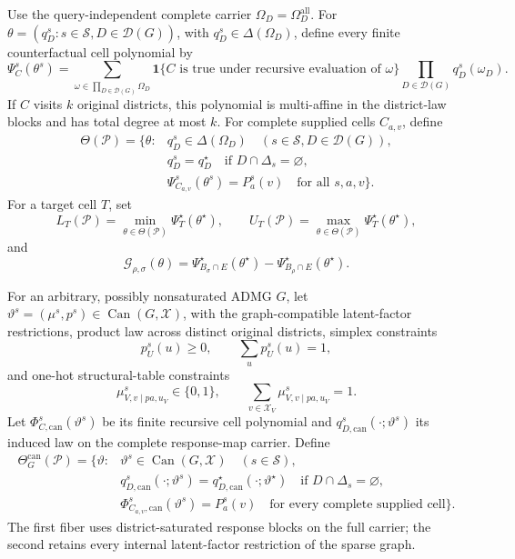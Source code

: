 Use the query-independent complete carrier \(\Omega_D=\Omega_D^{\mathrm{all}}\).  For \(\theta=(q_D^s:s\in\mathcal S,D\in\mathcal D(G))\), with \(q_D^s\in\Delta(\Omega_D)\), define every finite counterfactual cell polynomial by
\[
\Psi_C^s(\theta^s)=
\sum_{\omega\in\prod_{D\in\mathcal D(G)}\Omega_D}
\mathbf 1\{C\text{ is true under recursive evaluation of }\omega\}
\prod_{D\in\mathcal D(G)}q_D^s(\omega_D).
\]
If \(C\) visits \(k\) original districts, this polynomial is multi-affine in the district-law blocks and has total degree at most \(k\).  For complete supplied cells \(C_{a,v}\), define
\[
\begin{split}
\Theta(\mathcal P)=\bigl\{\theta:{}&q_D^s\in\Delta(\Omega_D)
\quad(s\in\mathcal S,D\in\mathcal D(G)),\\
&q_D^s=q_D^\star\quad\text{if }D\cap\Delta_s=\varnothing,\\
&\Psi_{C_{a,v}}^s(\theta^s)=P_a^s(v)
\quad\text{for all }s,a,v\bigr\}.
\end{split}
\]
For a target cell \(T\), set
\[
L_T(\mathcal P)=\min_{\theta\in\Theta(\mathcal P)}\Psi_T^\star(\theta^\star),
\qquad
U_T(\mathcal P)=\max_{\theta\in\Theta(\mathcal P)}\Psi_T^\star(\theta^\star),
\]
and
\[
\mathcal G_{\rho,\sigma}(\theta)=
\Psi_{B_\sigma\cap E}^\star(\theta^\star)-
\Psi_{B_\rho\cap E}^\star(\theta^\star).
\]

For an arbitrary, possibly nonsaturated ADMG \(G\), let
\(\vartheta^s=(\mu^s,p^s)\in\operatorname{Can}(G,\mathcal X)\), with the graph-compatible latent-factor restrictions, product law across distinct original districts, simplex constraints
\[
p_U^s(u)\geq0,
\qquad \sum_up_U^s(u)=1,
\]
and one-hot structural-table constraints
\[
\mu_{V,v\mid pa,u_V}^s\in\{0,1\},
\qquad
\sum_{v\in\mathcal X_V}\mu_{V,v\mid pa,u_V}^s=1.
\]
Let \(\Phi_{C,\mathrm{can}}^s(\vartheta^s)\) be its finite recursive cell polynomial and \(q_{D,\mathrm{can}}^s(\cdot;\vartheta^s)\) its induced law on the complete response-map carrier.  Define
\[
\begin{split}
\Theta_G^{\mathrm{can}}(\mathcal P)=\bigl\{\vartheta:{}&
\vartheta^s\in\operatorname{Can}(G,\mathcal X)\quad(s\in\mathcal S),\\
&q_{D,\mathrm{can}}^s(\cdot;\vartheta^s)
=q_{D,\mathrm{can}}^\star(\cdot;\vartheta^\star)
\quad\text{if }D\cap\Delta_s=\varnothing,\\
&\Phi_{C_{a,v},\mathrm{can}}^s(\vartheta^s)=P_a^s(v)
\quad\text{for every complete supplied cell}\bigr\}.
\end{split}
\]
The first fiber uses district-saturated response blocks on the full carrier; the second retains every internal latent-factor restriction of the sparse graph.